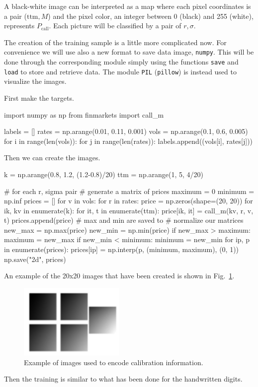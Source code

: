 A black-white image can be interpreted as a map where each pixel coordinates is a pair ($\mathrm{ttm}, M$) and the pixel color, an integer between 0 (black) and 255 (white), represents \(P_\textrm{call}\). Each picture will be classified by a pair of $r, \sigma$.

The creation of the training sample is a little more complicated now. For convenience we will use also a new format to save data image, \texttt{numpy}. This will be done through the corresponding module simply using the functions \texttt{save} and \texttt{load} to store and retrieve data. The module \texttt{PIL} (\texttt{pillow}) is instead used to visualize the images.

First make the targets.

\begin{ipython}
import numpy as np
from finmarkets import call_m

labels = []
rates = np.arange(0.01, 0.11, 0.001)
vols = np.arange(0.1, 0.6, 0.005)
for i in range(len(vols)):
    for j in range(len(rates)):
        labels.append((vols[i], rates[j]))
\end{ipython}
\noindent
Then we can create the images.

\begin{ipython}
k = np.arange(0.8, 1.2, (1.2-0.8)/20)
ttm = np.arange(1, 5, 4/20)

# for each r, sigma pair
# generate a matrix of prices
maximum = 0
minimum = np.inf
prices = []
for v in vols:
    for r in rates:
        price = np.zeros(shape=(20, 20))
        for ik, kv in enumerate(k):
            for it, t in enumerate(ttm):
                price[ik, it] = call_m(kv, r, v, t)
                prices.append(price)
                # max and min are saved to
                # normalize our matrices
                new_max = np.max(price)
                new_min = np.min(price)
                if new_max > maximum:
                    maximum = new_max
                if new_min < minimum:
                    minimum = new_min
for ip, p in enumerate(prices):
    prices[ip] = np.interp(p, (minimum, maximum), (0, 1))
np.save("2d", prices)
\end{ipython}
\noindent
An example of the 20x20 images that have been created is shown in Fig.~\ref{fig:test_images_calib}.

\begin{figure}[htb]
\centering
\includegraphics[width=0.45\textwidth]{figures/2d_training_images}
\caption{Example of images used to encode calibration information.}
\label{fig:test_images_calib}
\end{figure}
\noindent
Then the training is similar to what has been done for the handwritten digits.

